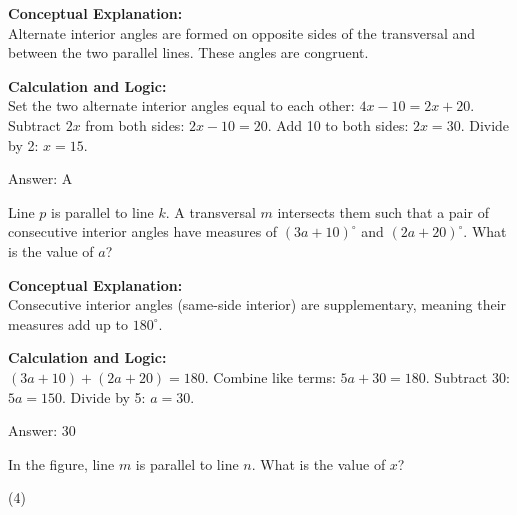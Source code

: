 \documentclass[11pt,paper=a4,answers]{exam}
\begin{document}
\begin{questions}
\begin{solution}
\textbf{Conceptual Explanation:} \\
Alternate interior angles are formed on opposite sides of the transversal and between the two parallel lines. These angles are congruent.

\vspace{30pt}

\textbf{Calculation and Logic:} \\
Set the two alternate interior angles equal to each other: $4x - 10 = 2x + 20$. Subtract $2x$ from both sides: $2x - 10 = 20$. Add 10 to both sides: $2x = 30$. Divide by 2: $x = 15$.

\vspace{30pt}

Answer: \colorbox{yellow!100}{A}
\end{solution}

\vspace{60pt}

\question
Line $p$ is parallel to line $k$. A transversal $m$ intersects them such that a pair of consecutive interior angles have measures of $(3a + 10)^\circ$ and $(2a + 20)^\circ$. What is the value of $a$?

\begin{solution}
\textbf{Conceptual Explanation:} \\
Consecutive interior angles (same-side interior) are supplementary, meaning their measures add up to $180^\circ$.

\vspace{30pt}

\textbf{Calculation and Logic:} \\
$(3a + 10) + (2a + 20) = 180$. Combine like terms: $5a + 30 = 180$. Subtract 30: $5a = 150$. Divide by 5: $a = 30$.

\vspace{30pt}

Answer: \colorbox{yellow!100}{30}
\end{solution}

\vspace{60pt}

\question
\begin{center}
\end{center}
In the figure, line $m$ is parallel to line $n$. What is the value of $x$?
\begin{tasks}(4)
\end{tasks}


\end{questions}
\end{document}

